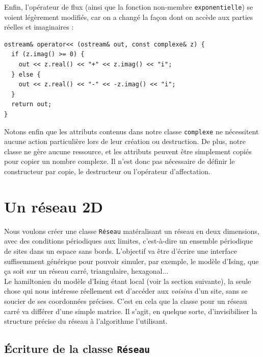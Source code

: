 \documentclass{book}
\newcommand{\inline}[1]{\texttt{#1}}
\begin{document}
\begin{correction}
Enfin, l'opérateur de flux (ainsi que la fonction non-membre \inline{exponentielle}) se voient légèrement modifiés, car on a changé la façon dont on accède aux parties réelles et imaginaires :
\begin{verbatim}
ostream& operator<< (ostream& out, const complexe& z) {
  if (z.imag() >= 0) {
    out << z.real() << "+" << z.imag() << "i";
  } else {
    out << z.real() << "-" << -z.imag() << "i";
  }
  return out;
}
\end{verbatim}

Notons enfin que les attributs contenus dans notre classe \inline{complexe} ne nécessitent aucune action particulière lors de leur création ou destruction. De plus, notre classe ne gère aucune ressource, et les attributs peuvent être simplement copiés pour copier un nombre complexe. Il n'est donc pas nécessaire de définir le constructeur par copie, le destructeur ou l'opérateur d'affectation.
\end{correction}

\section{Un réseau 2D}

Nous voulons créer une classe \inline{Réseau} matéralisant un réseau en deux dimensions, avec des conditions périodiques aux limites, c'est-à-dire un ensemble périodique de sites dans un espace sans bords. L'objectif va être d'écrire une interface suffisemment générique pour pouvoir simuler, par exemple, le modèle d'Ising, que ça soit sur un réseau carré, triangulaire, hexagonal...\\

Le hamiltonien du modèle d'Ising étant local (voir la section suivante), la seule chose qui nous intéresse réellement est d'accéder aux \emph{voisins} d'un site, sans se soucier de ses coordonnées précises. C'est en cela que la classe pour un réseau carré va différer d'une simple matrice. Il s'agit, en quelque sorte, d'invisibiliser la structure précise du réseau à l'algorithme l'utilisant.\\

\subsection{Écriture de la classe \inline{Réseau}}
\end{document}

